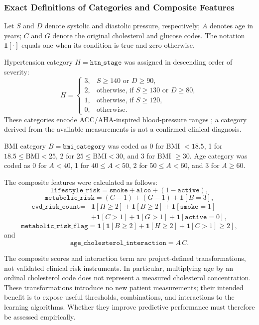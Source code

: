 \documentclass[11pt,a4paper]{article}
\newcommand{\code}[1]{\texttt{#1}}
\begin{document}
\subsubsection{Exact Definitions of Categories and Composite Features}

Let $S$ and $D$ denote systolic and diastolic pressure, respectively;
$A$ denotes age in years; $C$ and $G$ denote the original cholesterol and
glucose codes. The notation $\mathbf{1}[\cdot]$ equals one when its
condition is true and zero otherwise.

Hypertension category $H=\code{htn\_stage}$ was assigned in descending
order of severity:
\[
H=
\begin{cases}
3, & S\geq140 \text{ or } D\geq90,\\
2, & \text{otherwise, if } S\geq130 \text{ or } D\geq80,\\
1, & \text{otherwise, if } S\geq120,\\
0, & \text{otherwise}.
\end{cases}
\]
These categories encode ACC/AHA-inspired blood-pressure ranges
\cite{whelton2018}; a category derived from the available measurements
is not a confirmed clinical diagnosis.

BMI category $B=\code{bmi\_category}$ was coded as 0 for BMI $<18.5$,
1 for $18.5\leq\mathrm{BMI}<25$, 2 for
$25\leq\mathrm{BMI}<30$, and 3 for BMI $\geq30$.
Age category was coded as 0 for $A<40$, 1 for $40\leq A<50$,
2 for $50\leq A<60$, and 3 for $A\geq60$.

The composite features were calculated as follows:
\[
\code{lifestyle\_risk}
=
\code{smoke}+\code{alco}+(1-\code{active}),
\]
\[
\code{metabolic\_risk}
=
(C-1)+(G-1)+\mathbf{1}[B=3],
\]
\[
\begin{aligned}
\code{cvd\_risk\_count}
={}&\mathbf{1}[H\geq2]+\mathbf{1}[B\geq2]
+\mathbf{1}[\code{smoke}=1]\\
&+\mathbf{1}[C>1]+\mathbf{1}[G>1]
+\mathbf{1}[\code{active}=0],
\end{aligned}
\]
\[
\code{metabolic\_risk\_flag}
=
\mathbf{1}\!\left[
\mathbf{1}[B\geq2]+\mathbf{1}[H\geq2]+\mathbf{1}[C>1]\geq2
\right],
\]
and
\[
\code{age\_cholesterol\_interaction}=A\,C.
\]

The composite scores and interaction term are project-defined
transformations, not validated clinical risk instruments. In particular,
multiplying age by an ordinal cholesterol code does not represent a
measured cholesterol concentration. These transformations introduce no
new patient measurements; their intended benefit is to expose useful
thresholds, combinations, and interactions to the learning algorithms.
Whether they improve predictive performance must therefore be assessed
empirically.
\end{document}
